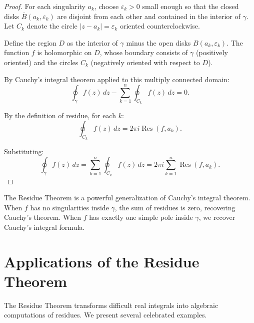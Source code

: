 \begin{proof}
  For each singularity $a_k$, choose $\varepsilon_k > 0$ small enough so that the closed disks $\overline{B}(a_k, \varepsilon_k)$ are disjoint from each other and contained in the interior of $\gamma$.
  Let $C_k$ denote the circle $|z - a_k| = \varepsilon_k$ oriented counterclockwise.

  Define the region $D$ as the interior of $\gamma$ minus the open disks $B(a_k, \varepsilon_k)$.
  The function $f$ is holomorphic on $D$, whose boundary consists of $\gamma$ (positively oriented) and the circles $C_k$ (negatively oriented with respect to $D$).

  By Cauchy's integral theorem applied to this multiply connected domain:
  \[
    \oint_{\gamma} f(z) \, dz - \sum_{k=1}^{n} \oint_{C_k} f(z) \, dz = 0.
  \]

  By the definition of residue, for each $k$:
  \[
    \oint_{C_k} f(z) \, dz = 2\pi i \operatorname{Res}(f, a_k).
  \]

  Substituting:
  \[
    \oint_{\gamma} f(z) \, dz = \sum_{k=1}^{n} \oint_{C_k} f(z) \, dz = 2\pi i \sum_{k=1}^{n} \operatorname{Res}(f, a_k).
  \]
\end{proof}

\begin{remark}
  The Residue Theorem is a powerful generalization of Cauchy's integral theorem.
  When $f$ has no singularities inside $\gamma$, the sum of residues is zero, recovering Cauchy's theorem.
  When $f$ has exactly one simple pole inside $\gamma$, we recover Cauchy's integral formula.
\end{remark}

\section{Applications of the Residue Theorem}

The Residue Theorem transforms difficult real integrals into algebraic computations of residues. We present several celebrated examples.

